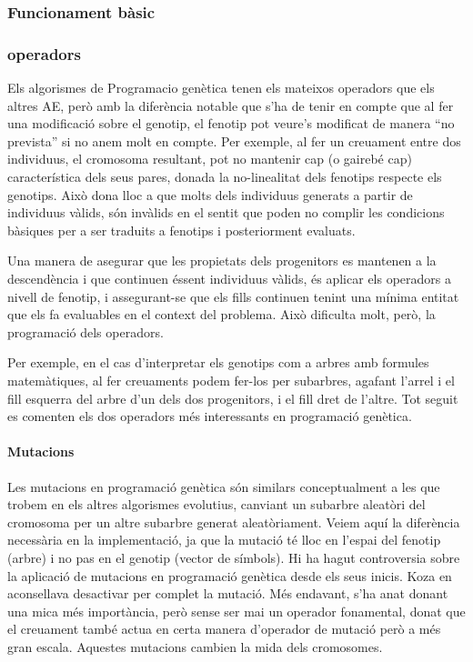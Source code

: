 \documentclass[titlepage,a4paper,12pt]{book}
\begin{document}
\subsubsection{Funcionament bàsic} %
\label{ssub:Funcionament basic}

\subsubsection{operadors} %
\label{ssub:operadors}

Els algorismes de Programacio genètica tenen els mateixos operadors que els
altres AE, però amb la diferència notable que s'ha de tenir en compte que al fer
una modificació sobre el genotip, el fenotip pot veure's modificat de manera
``no prevista'' si no anem molt en compte.  Per exemple, al fer un creuament
entre dos individuus, el cromosoma resultant, pot no mantenir cap (o gairebé
cap) característica dels seus pares, donada la no-linealitat dels fenotips
respecte els genotips.  Això dona lloc a que molts dels individuus generats a
partir de individuus vàlids, són invàlids en el sentit que poden no complir les
condicions bàsiques per a ser traduits a fenotips i posteriorment evaluats.

Una manera de asegurar que les propietats dels progenitors es mantenen a la
descendència i que continuen éssent individuus vàlids, és aplicar els operadors
a nivell de fenotip, i assegurant-se que els fills continuen tenint una mínima
entitat que els fa evaluables en el context del problema.  Això dificulta molt,
però, la programació dels operadors.

Per exemple, en el cas d'interpretar els genotips com a arbres amb formules
matemàtiques, al fer creuaments podem fer-los per subarbres, agafant l'arrel i
el fill esquerra del arbre d'un dels dos progenitors, i el fill dret de l'altre.
Tot seguit es comenten els dos operadors més interessants en programació
genètica.

\paragraph{Mutacions} %
\label{par:Mutacions}
Les mutacions en programació genètica són similars conceptualment a les que
trobem en els altres algorismes evolutius, canviant un subarbre aleatòri del
cromosoma per un altre subarbre generat aleatòriament.  Veiem aquí la diferència
necessària en la implementació, ja que la mutació té lloc en l'espai del fenotip
(arbre) i no pas en el genotip (vector de símbols).  Hi ha hagut controversia
sobre la aplicació de mutacions en programació genètica desde els seus inicis.
Koza en \cite{koza:92} aconsellava desactivar per complet la mutació.   Més
endavant, s'ha anat donant una mica més importància, però sense ser mai un
operador fonamental, donat que el creuament també actua en certa manera
d'operador de mutació però a més gran escala.  Aquestes mutacions cambien la
mida dels cromosomes.
\end{document}
